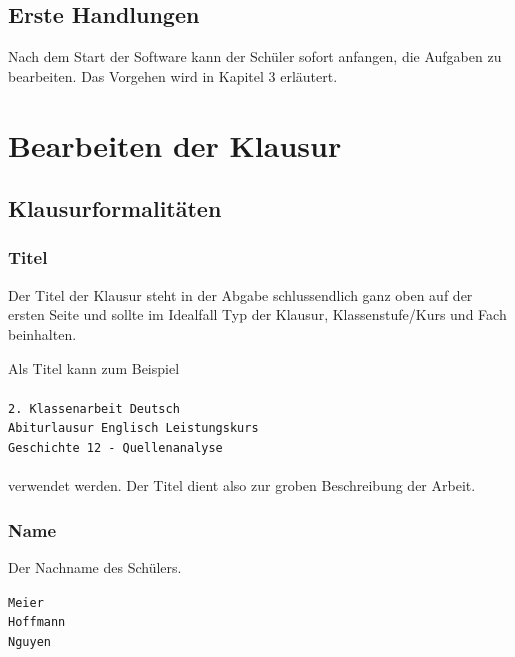 \documentclass[]{article}
\begin{document}
    \subsection{Erste Handlungen}
    Nach dem Start der Software kann der Schüler sofort anfangen, die Aufgaben zu bearbeiten. Das Vorgehen wird in Kapitel 3 erläutert.

    \newpage
    \section{Bearbeiten der Klausur}
    \subsection{Klausurformalitäten}
    \subsubsection{Titel}
    Der Titel der Klausur steht in der Abgabe schlussendlich ganz oben auf der ersten Seite und sollte im Idealfall Typ der Klausur, Klassenstufe/Kurs und Fach beinhalten.

	\begin{tcolorbox}[example, title=Beispiel: Titel]
		Als Titel kann zum Beispiel\\\\
		\hspace*{15pt}\texttt{2. Klassenarbeit Deutsch}\\
		\hspace*{15pt}\texttt{Abiturlausur Englisch Leistungskurs}\\
		\hspace*{15pt}\texttt{Geschichte 12 - Quellenanalyse}\\\\
		verwendet werden. Der Titel dient also zur groben Beschreibung der Arbeit.
	\end{tcolorbox}
	
	\subsubsection{Name}
	Der Nachname des Schülers.
	\begin{tcolorbox}[example, title=Beispiel: Name]
		\hspace*{15pt}\texttt{Meier}\\
		\hspace*{15pt}\texttt{Hoffmann}\\
		\hspace*{15pt}\texttt{Nguyen}
	\end{tcolorbox}
\end{document}
